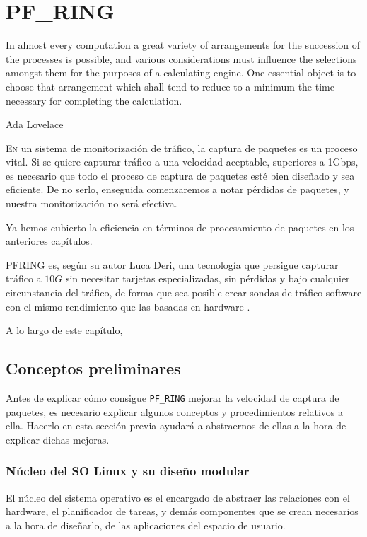 \chapter{PF\_RING}
\pagestyle{esitscCD}

\epigraph{In almost every computation a great variety of arrangements for the succession of the processes is possible, 
and various considerations must influence the selections amongst them for the purposes of a calculating engine. One 
essential object is to choose that arrangement which shall tend to reduce to a minimum the time necessary for completing 
the calculation.}{Ada Lovelace}

\lettrine[lraise=-0.1, lines=2, loversize=0.25]{E}n un sistema de monitorización de tráfico, la captura de paquetes es 
un proceso vital. Si se quiere capturar tráfico a una velocidad aceptable, superiores a 1Gbps, es necesario que todo el 
proceso de captura de paquetes esté bien diseñado y sea eficiente. De no serlo, enseguida comenzaremos a notar 
pérdidas de paquetes, y nuestra monitorización no será efectiva.

Ya hemos cubierto la eficiencia en términos de procesamiento de paquetes en los anteriores capítulos. 

\gls{PFRING} es, según su autor Luca Deri, una tecnología que persigue capturar tráfico a $10G$ sin necesitar 
tarjetas especializadas, sin pérdidas y bajo cualquier circunstancia del tráfico, de forma que sea posible crear sondas 
de tráfico software con el mismo rendimiento que las basadas en hardware \cite{LucaDeriPFRING}.

A lo largo de este capítulo, %

\section{Conceptos preliminares}
Antes de explicar cómo consigue \texttt{PF\_RING} mejorar la velocidad de captura de paquetes, es necesario explicar 
algunos conceptos y procedimientos relativos a ella. Hacerlo en esta sección previa ayudará a abstraernos de ellas a 
la hora de explicar dichas mejoras.

\subsection{Núcleo del SO Linux y su diseño modular}
El núcleo del sistema operativo es el encargado de abstraer las relaciones con el hardware, el planificador de tareas, 
y demás componentes que se crean necesarios a la hora de diseñarlo, de las aplicaciones del espacio de usuario.

